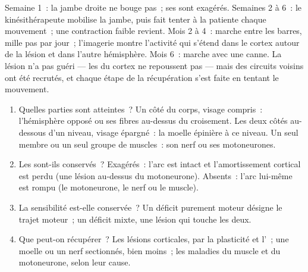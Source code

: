 \begin{example}\label{ex:g12:brain-and-movement:sixmonths}
Semaine 1~: la jambe droite ne bouge pas~; ses  sont exagérés.
Semaines 2 à 6~: le kinésithérapeute mobilise la jambe, puis fait
tenter à la patiente chaque mouvement~; une contraction faible
revient. Mois 2 à 4~: marche entre les barres, mille pas par jour~;
l'imagerie montre l'activité qui s'étend dans le cortex autour de la
lésion et dans l'autre hémisphère. Mois 6~: marche avec une canne. La
lésion n'a pas guéri --- les  du cortex ne repoussent
pas --- mais des circuits voisins ont été recrutés, et chaque étape de
la récupération s'est faite en tentant le mouvement.
\end{example}

\begin{method}\label{met:g12:brain-and-movement:locate}
\begin{enumerate}
  \item Quelles parties sont atteintes~? Un côté du corps, visage
        compris~: l'hémisphère opposé ou ses fibres au-dessus du
        croisement. Les deux côtés au-dessous d'un niveau, visage
        épargné~: la moelle épinière à ce niveau. Un seul membre ou un
        seul groupe de muscles~: son nerf ou ses motoneurones.
  \item Les  sont-ils conservés~? Exagérés~: l'arc est intact
        et l'amortissement cortical est perdu (une lésion au-dessus du
        motoneurone). Absents~: l'arc lui-même est rompu (le
        motoneurone, le nerf ou le muscle).
  \item La sensibilité est-elle conservée~? Un déficit purement moteur
        désigne le trajet moteur~; un déficit mixte, une lésion qui
        touche les deux.
  \item Que peut-on récupérer~? Les lésions corticales, par la
        plasticité et l'~; une moelle ou un nerf
        sectionnés, bien moins~; les maladies du muscle et du
        motoneurone, selon leur cause.
\end{enumerate}
\end{method}

